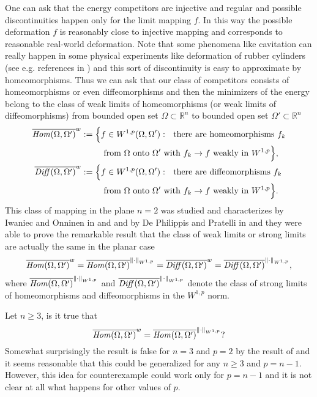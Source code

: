 \documentclass[12pt,a4paper]{amsart}
\theoremstyle{plain}
\theoremstyle{definition}
\numberwithin{equation}{section}
\def\Hom{{\it{Hom}}}
\def\Dif{{\it{Diff}}}
\def\rn{\mathbb R^n}
\begin{document}
One can ask that the energy competitors are injective and regular and possible discontinuities happen only for the limit mapping $f$. 
In this way the possible deformation $f$ is reasonably close to injective mapping and corresponds to reasonable real-world deformation. 
Note that some phenomena like cavitation can really happen in some physical experiments like deformation of rubber cylinders (see e.g. references in \cite{Bc}) and this sort of discontinuity is easy to approximate by homeomorphisms. Thus we can ask that our class of competitors consists of homeomorphisms or even diffeomorphisms and then the minimizers of the energy belong to the class of weak limits of homeomorphisms (or weak limits of diffeomorphisms) from bounded open set $\Omega\subset\rn$ to bounded open set $\Omega'\subset\rn$ 
$$
\begin{aligned}
\overline{\Hom(\Omega,\Omega')}^{w}:=\Bigl\{&f\in W^{1,p}(\Omega,\Omega'):\ \text{ there are homeomorphisms }f_k\\
&\text{ from }\Omega\text{ onto }\Omega'\text{ with }f_k\to f\text{ weakly in }W^{1,p}\Bigr\},\\
\overline{\Dif(\Omega,\Omega')}^{w}:=\Bigl\{&f\in W^{1,p}(\Omega,\Omega'):\ \text{ there are diffeomorphisms }f_k\\
&\text{ from }\Omega\text{ onto }\Omega'\text{ with }f_k\to f\text{ weakly in }W^{1,p}\Bigr\}.\\
\end{aligned}
$$
This class of mapping in the plane $n=2$ was studied and characterizes by Iwaniec and Onninen in \cite{IO} and \cite{IO2} and by De Philippis and Pratelli in \cite{DPP} and they were able to prove the remarkable result that the class of weak limits or strong limits are actually the same in the planar case
$$
\overline{\Hom(\Omega,\Omega')}^{w}=\overline{\Hom(\Omega,\Omega')}^{\|\cdot\|_{W^{1,p}}}=\overline{\Dif(\Omega,\Omega')}^{w}=\overline{\Dif(\Omega,\Omega')}^{\|\cdot\|_{W^{1,p}}},
$$
where $\overline{\Hom(\Omega,\Omega')}^{\|\cdot\|_{W^{1,p}}}$ and $\overline{\Dif(\Omega,\Omega')}^{\|\cdot\|_{W^{1,p}}}$ denote the class of strong limits of homeomorphisms and diffeomorphisms in the $W^{1,p}$ norm. 

 Let $n\geq 3$, is it true that 
$$
\overline{\Hom(\Omega,\Omega')}^{w}=\overline{\Hom(\Omega,\Omega')}^{\|\cdot\|_{W^{1,p}}}?
$$
Somewhat surprisingly the result is false for $n=3$ and $p=2$ by the result of \cite{DHM} and it seems reasonable that this could be generalized for any $n\geq 3$ and $p=n-1$. However, this idea for counterexample could work only for $p=n-1$ and it is not clear at all what happens for other values of $p$. 
\end{document}
